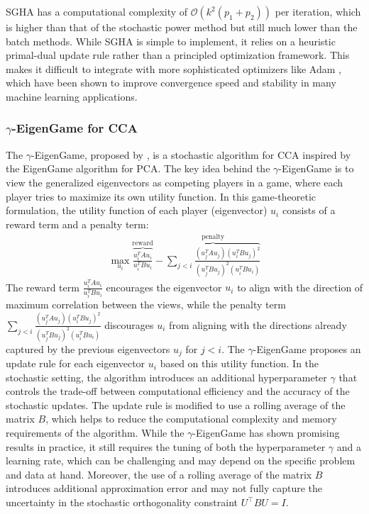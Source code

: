 SGHA has a computational complexity of $\mathcal{O}(k^2(p_1+ p_2))$ per iteration, which is higher than that of the stochastic power method but still much lower than the batch methods.
While SGHA is simple to implement, it relies on a heuristic primal-dual update rule rather than a principled optimization framework. This makes it difficult to integrate with more sophisticated optimizers like Adam \citep{kingma2014adam}, which have been shown to improve convergence speed and stability in many machine learning applications.
\subsubsection{$\gamma$-EigenGame for CCA}
The $\gamma$-EigenGame, proposed by \citet{gemp20,gemp2021}, is a stochastic algorithm for CCA inspired by the EigenGame algorithm for PCA. The key idea behind the $\gamma$-EigenGame is to view the generalized eigenvectors as competing players in a game, where each player tries to maximize its own utility function.
In this game-theoretic formulation, the utility function of each player (eigenvector) $u_i$ consists of a reward term and a penalty term:
\begin{align}
\max_{u_i} \overbrace{\frac{u_i^TAu_i}{u_i^TBu_i}}^{\text{reward}} - \overbrace{\sum_{j < i} \frac{(u_j^TAu_j)(u_i^TBu_j)^2}{(u_j^TBu_j)^2(u_i^TBu_i)}}^{\text{penalty}}
\end{align}
The reward term $\frac{u_i^TAu_i}{u_i^TBu_i}$ encourages the eigenvector $u_i$ to align with the direction of maximum correlation between the views, while the penalty term $\sum_{j < i} \frac{(u_j^TAu_j)(u_i^TBu_j)^2}{(u_j^TBu_j)^2(u_i^TBu_i)}$ discourages $u_i$ from aligning with the directions already captured by the previous eigenvectors $u_j$ for $j < i$.
The $\gamma$-EigenGame proposes an update rule for each eigenvector $u_i$ based on this utility function. In the stochastic setting, the algorithm introduces an additional hyperparameter $\gamma$ that controls the trade-off between computational efficiency and the accuracy of the stochastic updates. The update rule is modified to use a rolling average of the matrix $B$, which helps to reduce the computational complexity and memory requirements of the algorithm.
While the $\gamma$-EigenGame has shown promising results in practice, it still requires the tuning of both the hyperparameter $\gamma$ and a learning rate, which can be challenging and may depend on the specific problem and data at hand.
Moreover, the use of a rolling average of the matrix $B$ introduces additional approximation error and may not fully capture the uncertainty in the stochastic orthogonality constraint $U^\top B U = I$.


